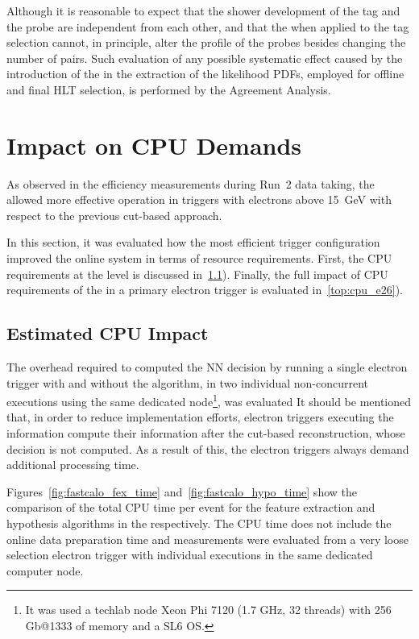 Although it is reasonable to expect that the shower development of the tag and
the probe are independent from each other, and that the \rnn{} when applied to
the tag selection cannot, in principle, alter the profile of the probes besides
changing the number of \tnp{} pairs. Such evaluation of any possible systematic effect caused by the introduction of the \rnn{} in the extraction of the likelihood PDFs, employed for offline and final HLT selection, is performed by the Agreement Analysis.

\FloatBarrier
\section{Impact on CPU Demands} %

As observed in the efficiency measurements during Run~2 data taking, the \rnn{} allowed more effective \fastcalo{} operation in triggers with electrons above \SI{15}{\GeV}  with respect to the previous cut-based approach. 


In this section, it was evaluated how the most efficient trigger configuration 
improved the online system in terms of resource requirements. First, the CPU 
requirements at the \fastcalo{} level is discussed in~\ref{top:fastcalo_cpu}). Finally, 
the full impact of CPU requirements of the \rnn{} in a primary electron trigger is evaluated in~\ref{top:cpu_e26}).


\subsection{Estimated CPU Impact}\label{top:fastcalo_cpu}


The overhead required to computed the NN decision by running a single electron trigger with and without the \rnn algorithm, in two individual non-concurrent executions using the same dedicated node\footnote{It was used a techlab node Xeon Phi 7120 (1.7 GHz, 32 threads) with 256 Gb@1333 of memory and a SL6 OS.}, was evaluated
It should be mentioned that, in order to reduce implementation efforts, electron triggers executing the \rnn{} information compute their information after the cut-based reconstruction, whose decision is not computed. As a result of this, the \rnn{} electron 
triggers always demand additional \fastcalo processing time.

Figures~\ref{fig:fastcalo_fex_time} and~\ref{fig:fastcalo_hypo_time} show the comparison of the total CPU time per event for the feature extraction and hypothesis algorithms in the \fastcalo respectively.
The CPU time does not include the online data preparation time and measurements were evaluated from a very loose selection electron trigger with individual executions in the same dedicated computer node.


